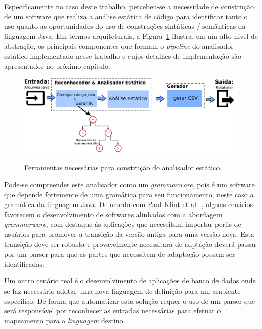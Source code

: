 Especificamente no caso deste trabalho, percebeu-se a necessidade de construç\~{a}o de um software que 
realiza a an\'{a}lise est\'{a}tica de c\'{o}digo para identificar tanto o uso quanto as oportunidades do uso de construç\~{o}es 
sint\'{a}ticas / sem\^{a}nticas da linguagem Java. Em termos arquiteturais, a Figura~\ref{fig:stagesAnalyzer} ilustra, 
em um alto n\'{i}vel de abstra\c c\~{a}o, os principais componentes que formam o \emph{pipeline} do analisador est\'{a}tico 
implementado nesse trabalho e cujos detalhes de implementa\c c\~{a}o s\~{a}o apresentados no pr\'{o}ximo cap\'{i}tulo.

\begin{figure}[h]
	\center
	\includegraphics[scale=0.9]{Imagens/stagesAnalizer}
	\label{fig:stagesAnalyzer}
	\caption{Ferramentas necess\'{a}rias para construç\~{a}o do analisador est\'{a}tico.}
\end{figure}


Pode-se compreender este analisador como um \emph{grammarware}, pois \'{e} um software 
que depende fortemente de uma gram\'{a}tica para seu funcionamento; neste caso a gram\'{a}tica da linguagem Java. 
De acordo com Paul Klint et al.~\cite{klint2005toward}, alguns cen\'{a}rios favorecem o desenvolvimento de softwares alinhados com a abordagem 
\emph{grammarware}, com destaque \`{a}s aplicaç\~{o}es que necessitam importar perfis de usu\'{a}rios para promover a transiç\~{a}o da vers\~{a}o 
antiga para uma vers\~{a}o nova. 
Esta transiç\~{a}o deve ser robusta e provavelmente necessitar\'{a} de adptaç\~{a}o dever\'{a} passar 
por um parser para que as partes que necessitem de adaptaç\~{a}o possam ser identificadas.

Um outro cen\'{a}rio real \'{e} o desenvolvimento de aplicaç\~{o}es de banco de dados onde se faz necess\'{a}rio adotar 
uma nova linguagem de definiç\~{a}o para um ambiente espec\'{i}fico. De forma que automatizar esta soluç\~{a}o requer o uso de um 
parser que ser\'{a} respons\'{a}vel por reconhecer as entradas necess\'{a}rias para efetuar o mapeamento 
para a \emph{linguagem} destino.


